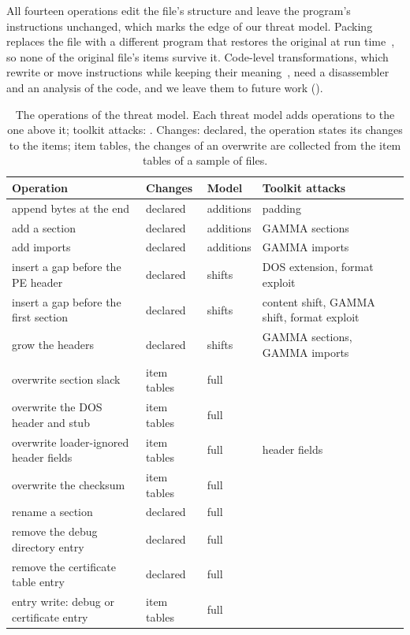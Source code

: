 All fourteen operations edit the file's structure and leave the program's instructions unchanged, which marks the edge of our threat model.
Packing replaces the file with a different program that restores the original at run time~\cite{demetrio2021adversarial},
so none of the original file's items survive it. Code-level transformations, which rewrite or move instructions while
keeping their meaning~\cite{song2022mab,lucas2021malware,lucas2023adversarial,ling2024wolf}, need a disassembler and an
analysis of the code, and we leave them to future work ().

\begin{table}[t]
  \caption{The operations of the threat model. Each threat model adds operations to the one above it; toolkit
  attacks: . Changes: declared, the operation states its changes to the items; item tables, the
  changes of an overwrite are collected from the item tables of a sample of files.}
  \label{tab:instances:catalogue}
  \footnotesize
  \setlength{\tabcolsep}{3pt}
  \begin{tabular}{@{}lllp{}@{}}
    \toprule
    Operation & Changes & Model & Toolkit attacks \\
    \midrule
    append bytes at the end & declared & additions & padding \\
    add a section & declared & additions & GAMMA sections \\
    add imports & declared & additions & GAMMA imports \\
    insert a gap before the PE header & declared & shifts & \raggedright DOS extension, format exploit \tabularnewline
    insert a gap before the first section & declared & shifts &
      \raggedright content shift, GAMMA shift, format exploit \tabularnewline
    grow the headers & declared & shifts & \raggedright GAMMA sections, GAMMA imports \tabularnewline
    overwrite section slack & item tables & full & \\
    overwrite the DOS header and stub & item tables & full & \\
    overwrite loader-ignored header fields & item tables & full & header fields \\
    overwrite the checksum & item tables & full & \\
    rename a section & declared & full & \\
    remove the debug directory entry & declared & full & \\
    remove the certificate table entry & declared & full & \\
    entry write: debug or certificate entry & item tables & full & \\
    \bottomrule
  \end{tabular}
\end{table}

